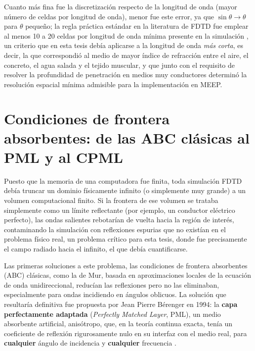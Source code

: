 Cuanto más fina fue la discretización respecto de la longitud de onda (mayor número de celdas por longitud de onda), menor fue este error, ya que $\sin\theta\to\theta$ para $\theta$ pequeño; la regla práctica estándar en la literatura de FDTD fue emplear al menos 10 a 20 celdas por longitud de onda mínima presente en la simulación \cite{Taflove2005,Schneider2025}, un criterio que en esta tesis debía aplicarse a la longitud de onda \textit{más corta}, es decir, la que correspondió al medio de mayor índice de refracción entre el aire, el concreto, el agua salada y el tejido muscular, y que junto con el requisito de resolver la profundidad de penetración en medios muy conductores determinó la resolución espacial mínima admisible para la implementación en MEEP.

\section{Condiciones de frontera absorbentes: de las ABC clásicas al PML y al CPML}
Puesto que la memoria de una computadora fue finita, toda simulación FDTD debía truncar un dominio físicamente infinito (o simplemente muy grande) a un volumen computacional finito. Si la frontera de ese volumen se trataba simplemente como un límite reflectante (por ejemplo, un conductor eléctrico perfecto), las ondas salientes rebotarían de vuelta hacia la región de interés, contaminando la simulación con reflexiones espurias que no existían en el problema físico real, un problema crítico para esta tesis, donde fue precisamente el campo radiado hacia el infinito, el que debía cuantificarse.

Las primeras soluciones a este problema, las condiciones de frontera absorbentes (ABC) clásicas, como la de Mur, basada en aproximaciones locales de la ecuación de onda unidireccional, reducían las reflexiones pero no las eliminaban, especialmente para ondas incidiendo en ángulos oblicuos. La solución que resultaría definitiva fue propuesta por Jean Pierre Bérenger en 1994: la \textbf{capa perfectamente adaptada} (\textit{Perfectly Matched Layer}, PML), un medio absorbente artificial, anisótropo, que, en la teoría continua exacta, tenía un coeficiente de reflexión rigurosamente nulo en su interfaz con el medio real, para \textbf{cualquier} ángulo de incidencia y \textbf{cualquier} frecuencia \cite{Berenger1994}.

